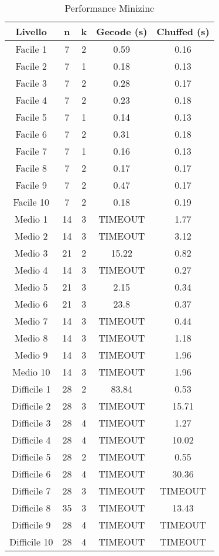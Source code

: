 \documentclass{article}
\begin{document}
\begin{multicols*}{2}
\begin{table}[H]
    \centering
    \caption{Performance Minizinc}\label{tab:minizinc}
    \begin{tabular}{|c|c|c|c|c|}
        \hline
        \textbf{Livello} & \textbf{n} & \textbf{k} & \textbf{Gecode (s)} & \textbf{Chuffed (s)} \\
        \hline
        Facile 1 & 7 & 2 & 0.59 & 0.16 \\
        Facile 2 & 7 & 1 & 0.18 & 0.13 \\
        Facile 3 & 7 & 2 & 0.28 & 0.17 \\
        Facile 4 & 7 & 2 & 0.23 & 0.18 \\
        Facile 5 & 7 & 1 & 0.14 & 0.13 \\
        Facile 6 & 7 & 2 & 0.31 & 0.18 \\
        Facile 7 & 7 & 1 & 0.16 & 0.13 \\
        Facile 8 & 7 & 2 & 0.17 & 0.17 \\
        Facile 9 & 7 & 2 & 0.47 & 0.17 \\
        Facile 10 & 7 & 2 & 0.18 & 0.19 \\
        \hline
        Medio 1 & 14 & 3 & TIMEOUT & 1.77 \\
        Medio 2 & 14 & 3 & TIMEOUT & 3.12 \\
        Medio 3 & 21 & 2 & 15.22 & 0.82 \\
        Medio 4 & 14 & 3 & TIMEOUT & 0.27 \\
        Medio 5 & 21 & 3 & 2.15 & 0.34 \\
        Medio 6 & 21 & 3 & 23.8 & 0.37 \\
        Medio 7 & 14 & 3 & TIMEOUT & 0.44 \\
        Medio 8 & 14 & 3 & TIMEOUT & 1.18 \\
        Medio 9 & 14 & 3 & TIMEOUT & 1.96 \\
        Medio 10 & 14 & 3 & TIMEOUT & 1.96 \\
        \hline
        Difficile 1 & 28 & 2 & 83.84 & 0.53 \\
        Difficile 2 & 28 & 3 & TIMEOUT & 15.71 \\
        Difficile 3 & 28 & 4 & TIMEOUT & 1.27 \\
        Difficile 4 & 28 & 4 & TIMEOUT & 10.02 \\
        Difficile 5 & 28 & 2 & TIMEOUT & 0.55 \\
        Difficile 6 & 28 & 4 & TIMEOUT & 30.36 \\
        Difficile 7 & 28 & 3 & TIMEOUT & TIMEOUT \\
        Difficile 8 & 35 & 3 & TIMEOUT & 13.43 \\
        Difficile 9 & 28 & 4 & TIMEOUT & TIMEOUT \\
        Difficile 10 & 28 & 4 & TIMEOUT & TIMEOUT \\
        \hline
    \end{tabular}
\end{table}


\end{multicols*}
\end{document}
